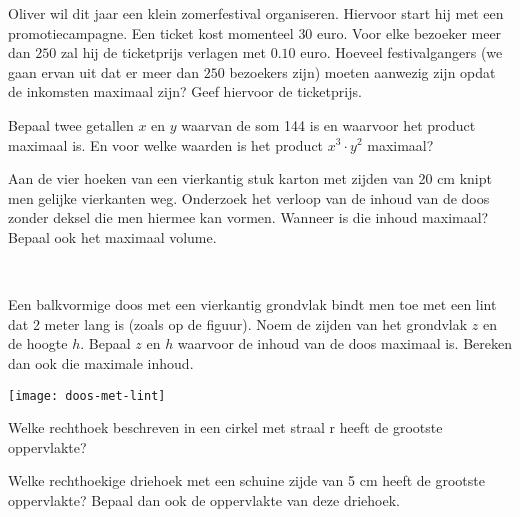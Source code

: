 \documentclass[a4paper,12pt,twoside]{article}
\begin{document}
\begin{oefening}
  Oliver wil dit jaar een klein zomerfestival organiseren. Hiervoor start hij met een promotiecampagne. Een ticket kost momenteel $30$ euro. Voor elke bezoeker meer dan $250$ zal hij de ticketprijs verlagen met $0.10$ euro. Hoeveel festivalgangers (we gaan ervan uit dat er meer dan $250$ bezoekers zijn) moeten aanwezig zijn opdat de inkomsten maximaal zijn? Geef hiervoor de ticketprijs.
\end{oefening}

\begin{oefening}
  Bepaal twee getallen $x$ en $y$ waarvan de som 144 is en waarvoor het product maximaal
  is. En voor welke waarden is het product $x^3\cdot y^2$ maximaal?
\end{oefening}

\begin{oefening}
  Aan de vier hoeken van een vierkantig stuk karton met zijden van 20 cm knipt men gelijke vierkanten weg. Onderzoek het verloop van de inhoud van de doos zonder deksel die men hiermee kan vormen. Wanneer is die inhoud maximaal? Bepaal ook het maximaal volume.
\end{oefening}

\begin{oefening}\\
  \begin{minipage}{0.6\textwidth}
    Een balkvormige doos met een vierkantig grondvlak bindt men toe met een lint dat
    2 meter lang is (zoals op de figuur). Noem de zijden van het grondvlak $z$ en de hoogte
    $h$. Bepaal $z$ en $h$ waarvoor de inhoud van de doos maximaal is. Bereken dan ook die
    maximale inhoud.
  \end{minipage}
  \begin{minipage}{0.4\textwidth}
    \centering
    \texttt{[image: doos-met-lint]}
  \end{minipage}
\end{oefening}

\begin{oefening}
  Welke rechthoek beschreven in een cirkel met straal r heeft de grootste oppervlakte?
\end{oefening}

\begin{oefening}
  Welke rechthoekige driehoek met een schuine zijde van 5 cm heeft de grootste
  oppervlakte? Bepaal dan ook de oppervlakte van deze driehoek.
\end{oefening}
\end{document}
